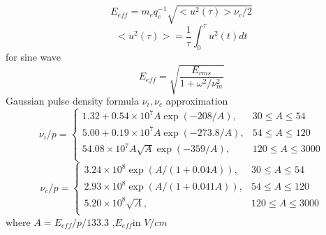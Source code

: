 \documentclass[a4paper,10pt]{article}
\begin{document}
\begin{equation}\label{EeffNorm}
E_{eff} = m_{e} q_{e}^{-1} \sqrt{ < u^{2}(\tau) > \nu_{c} /2 }
\end{equation}
\begin{equation}
<u^{2}(\tau)>=\frac{1}{\tau}\int^{\tau}_{0}u^{2}(t)d t
\end{equation}
for sine wave
\begin{equation}
E_{eff}=\sqrt{\frac{E_{rms}}{1+\omega^{2}/\nu^{2}_{m}}}
\end{equation}
Gaussian pulse density formula
$\nu_{i},\nu_c$ approximation
\begin{equation}\label{nu_i_1}
\nu_{i}/p=\left\lbrace\begin{array}{ll}
1.32+0.54\times 10^7A \exp \left(-208/A\right),&30\leqslant A\leqslant 54\\
5.00+0.19\times 10^7A \exp \left(-273.8/A\right),&54\leqslant A\leqslant 120\\
54.08\times 10^7A \sqrt{A} \exp \left(-359/A\right),&120\leqslant A\leqslant 3000\\
\end{array}\right.
\end{equation}
\begin{equation}\label{nu_c_1}
\nu_{c}/p=\left\lbrace\begin{array}{ll}
3.24\times 10^8 \exp\left( A/(1+0.04A)\right),&30\leqslant A\leqslant 54\\
2.93\times 10^8 \exp\left( A/(1+0.041A)\right),&54\leqslant A\leqslant 120\\
5.20\times 10^8 \sqrt{A},&120\leqslant A\leqslant 3000\\
\end{array}\right.
\end{equation}
where $A=E_{eff}/p/133.3$ ,$E_{eff}$in $V/cm$
\end{document}
